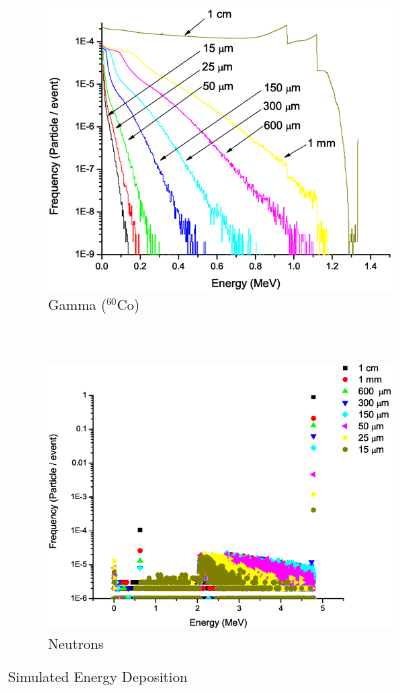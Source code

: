 \documentclass{anstrans}
\newcommand{\iso}[2]{${}^{#2}${#1}}
\newcommand{\figurewidth}{0.45\textwidth}
\begin{document}
\begin{figure}[h]
	\centering
	\begin{subfigure}[b]{\figurewidth}
    		\includegraphics[width=\textwidth]{PS_EDepSim_Co60}
		\caption{Gamma (\iso{Co}{60})}
	\end{subfigure}%
	~
	\begin{subfigure}[b]{\figurewidth}
    		\includegraphics[width=\textwidth]{PS_EDepSim_Neutron}
		\caption{Neutrons}
	\end{subfigure}%
	\caption{Simulated Energy Deposition}
	\label{fig:SimEDepGamma}
\end{figure}
\end{document}
